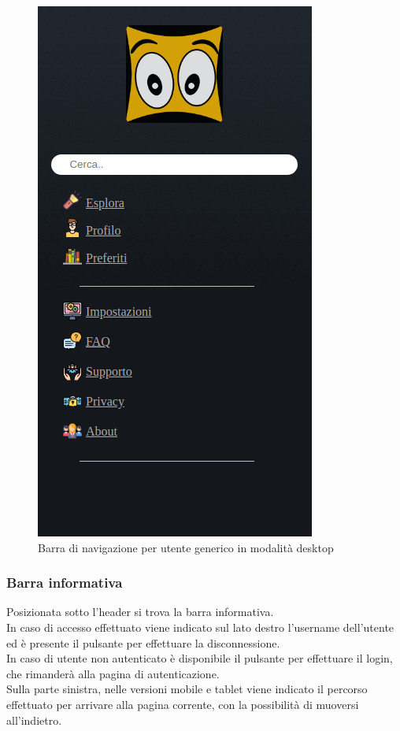 \begin{figure}[H]
	\centerline{\includegraphics[scale=0.45]{img/nav_bar.png}}
	\caption{Barra di navigazione per utente generico in modalità desktop}
	\label{fig:navbarGU}
\end{figure}

\subsubsection{Barra informativa}
Posizionata sotto l'header si trova la barra informativa.\\
In caso di accesso effettuato viene indicato sul lato destro l'username dell'utente ed è presente il pulsante per effettuare la disconnessione.\\
In caso di utente non autenticato è disponibile il pulsante per effettuare il login, che rimanderà alla pagina di autenticazione.\\
Sulla parte sinistra, nelle versioni mobile e tablet viene indicato il percorso effettuato per arrivare alla pagina corrente, con la possibilità di muoversi all'indietro. 


